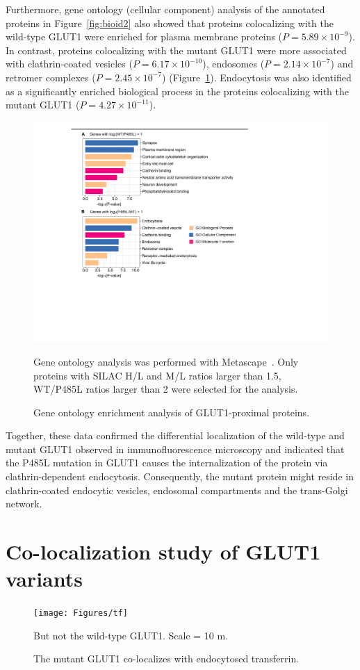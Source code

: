 Furthermore, gene ontology (cellular component) analysis of the annotated proteins in Figure~\ref{fig:bioid2} also showed that proteins colocalizing with the wild-type GLUT1 were enriched for plasma membrane proteins ($P=5.89\times 10^{-9}$). In contrast, proteins colocalizing with the mutant GLUT1 were more associated with clathrin-coated vesicles ($P=6.17\times 10^{-10}$), endosomes ($P=2.14\times 10^{-7}$) and retromer complexes ($P=2.45\times 10^{-7}$) (Figure~\ref{fig:go}). Endocytosis was also identified as a significantly enriched biological process in the proteins colocalizing with the mutant GLUT1 ($P=4.27\times 10^{-11}$).
\begin{figure}[h]
\centering
\includegraphics[scale=0.7]{Figures/GO}
\caption{Gene ontology enrichment analysis of GLUT1-proximal proteins.}
\vspace*{-3mm}
\small \justify
Gene ontology analysis was performed with Metascape~\cite{Tripathi}. Only proteins with SILAC H/L and M/L ratios larger than 1.5, WT/P485L ratios larger than 2 were selected for the analysis.
\label{fig:go}
\end{figure}

Together, these data confirmed the differential localization of the wild-type and mutant GLUT1 observed in immunofluorescence microscopy and indicated that the P485L mutation in GLUT1 causes the internalization of the protein via clathrin-dependent endocytosis. Consequently, the mutant protein might reside in clathrin-coated endocytic vesicles, endosomal compartments and the trans-Golgi network.
\section{Co-localization study of GLUT1 variants}
\begin{figure}[h]
\centering
\texttt{[image: Figures/tf]}
\caption{The mutant GLUT1 co-localizes with endocytosed transferrin.}
\vspace*{-3mm}
\small \justify
But not the wild-type GLUT1. Scale = 10 \textmu m.
\label{fig:tf}
\end{figure}

